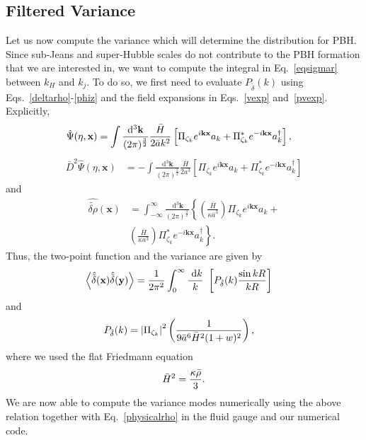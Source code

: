 \documentclass[a4paper,11pt]{article}
\begin{document}
\subsection{Filtered Variance}

Let us now compute the variance which will determine the distribution for PBH. Since
sub-Jeans and super-Hubble scales do not contribute to the PBH formation that we are
interested in, we want to compute the integral in  Eq.~\eqref{eqsigmar} between $k_H$
and $k_j$. To do so, we first need to evaluate $P_{\tilde{\delta}}(k)$ using
Eqs.~\eqref{deltarho}-\eqref{phiz} and the field expansions in Eqs.~\eqref{vexp}
and~\eqref{pvexp}. Explicitly,
\begin{align}
	\label{psiq}
	\hat{\Psi}(\eta,\textbf{x}) & =\int\frac{\mathrm{d}^3\textbf{k}}{(2\pi)^{\frac{3}{2}}}
	\frac{\bar{H}}{2\Bar{a}k^2}\left[\Pi_{\zeta_{k}} e^{i\textbf{k}\textbf{x}} a_{k} +
	\Pi_{\zeta_{k}}^{ *}e^{-i\textbf{k}\textbf{x}} a_{k}^{\dagger}\right]
	,\end{align}
\begin{align}
	\bar{D}^2\hat{\Psi}(\eta,\textbf{x}) & =
	-\int\frac{\mathrm{d}^3\textbf{k}}{(2\pi)^{\frac{3}{2}}}
	\frac{\bar{H}}{2a^3 }\left[\Pi_{\zeta_{k}} e^{i\textbf{k}\textbf{x}} a_{k} +
	\Pi_{\zeta_{k}}^{*}e^{-i\textbf{k}\textbf{x}} a_{k}^{\dagger}\right]
\end{align}
and
\begin{align}
	\hat{\tilde{\delta\rho}}(\textbf{x}) & =
	\int_{-\infty}^{\infty}\frac{\mathrm{~d}^3\textbf{k}}{(2\pi)^{\frac{3}{2}}}
	\left\{ \left(\frac{\bar{H}}{\kappa \bar{a}^3}\right)\Pi_{\zeta_{k}} e^{i\textbf{k}\textbf{x}} a_{k} +\right. \nonumber                                     \\
	                                     & \left. \left(\frac{\bar{H}}{\kappa a^3}\right)\Pi_{\zeta_{k}}^{*} e^{-i\textbf{k}\textbf{x}} a_{k}^{\dagger}\right\}
	.\end{align}
Thus, the two-point function and the variance are given by
\begin{align}
	\label{2point}
	\left<\hat{\Tilde{\delta}}(\textbf{x})\hat{\Tilde{\delta}}(\textbf{y})\right> & =
	\frac{1}{2\pi^2} \int_0^\infty \frac{\mathrm{~d}k}{k}~\left[P_{\tilde{\delta}}(k)
		\frac{\sin{kR}}{kR} \right]
\end{align}
and
\begin{align}
	P_{\tilde{\delta}}(k) & = \abs{\Pi_{\zeta_{k}}}^2\left( \frac{1}{9\bar{a}^6 \Bar{H}^2(1+w)^2}\right),
\end{align}
where we used the flat Friedmann equation
\begin{align}
	\bar{H}^2 = \frac{\kappa \Bar{\rho}}{3}.
\end{align}
We are now able to compute the variance modes numerically using the above relation
together with Eq.~\eqref{physicalrho} in the fluid gauge and our numerical code.
\end{document}
